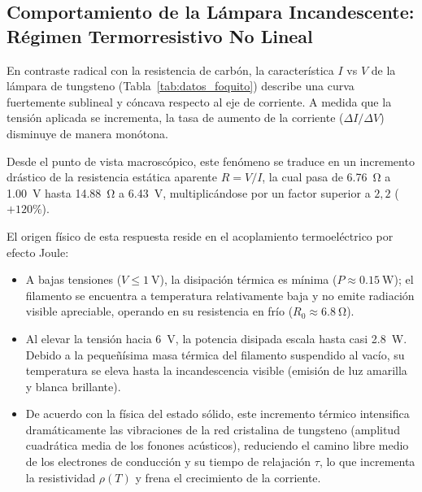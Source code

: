 \subsection{Comportamiento de la Lámpara Incandescente: Régimen Termorresistivo No Lineal}
En contraste radical con la resistencia de carbón, la característica $I$ vs $V$ de la lámpara de tungsteno (Tabla~\ref{tab:datos_foquito}) describe una curva fuertemente sublineal y cóncava respecto al eje de corriente. A medida que la tensión aplicada se incrementa, la tasa de aumento de la corriente ($\Delta I / \Delta V$) disminuye de manera monótona.

Desde el punto de vista macroscópico, este fenómeno se traduce en un incremento drástico de la resistencia estática aparente $R = V/I$, la cual pasa de \qty{6,76}{\ohm} a \qty{1,00}{\volt} hasta \qty{14,88}{\ohm} a \qty{6,43}{\volt}, multiplicándose por un factor superior a $2{,}2$ ($+120\%$).

El origen físico de esta respuesta reside en el acoplamiento termoeléctrico por efecto Joule:
\begin{itemize}
    \item A bajas tensiones ($V \le \qty{1}{\volt}$), la disipación térmica es mínima ($P \approx \qty{0,15}{\watt}$); el filamento se encuentra a temperatura relativamente baja y no emite radiación visible apreciable, operando en su resistencia en frío ($R_0 \approx \qty{6,8}{\ohm}$).
    \item Al elevar la tensión hacia \qty{6}{\volt}, la potencia disipada escala hasta casi \qty{2,8}{\watt}. Debido a la pequeñísima masa térmica del filamento suspendido al vacío, su temperatura se eleva hasta la incandescencia visible (emisión de luz amarilla y blanca brillante).
    \item De acuerdo con la física del estado sólido, este incremento térmico intensifica dramáticamente las vibraciones de la red cristalina de tungsteno (amplitud cuadrática media de los fonones acústicos), reduciendo el camino libre medio de los electrones de conducción y su tiempo de relajación $\tau$, lo que incrementa la resistividad $\rho(T)$ y frena el crecimiento de la corriente.
\end{itemize}

